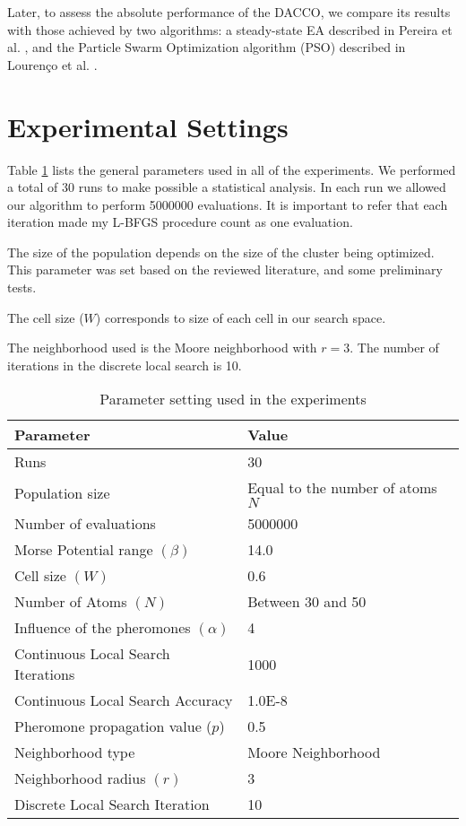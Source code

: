 	Later, to assess the absolute performance of the DACCO, we compare its results with those achieved by two algorithms: a steady-state EA described in Pereira et al. \cite{xico09}, and the Particle Swarm Optimization algorithm (PSO) described in Lourenço et al. \cite{lourenco11}.
	
\section{Experimental Settings}
\label{sec:experimental_setting}

Table \ref{tab:general_settings} lists the general parameters used in all of the experiments. We performed a total of 30 runs to make possible a statistical analysis. In each run we allowed our algorithm to perform 5000000 evaluations. It is important to refer that each iteration made my L-BFGS procedure count as one evaluation. 

The size of the population depends on the size of the cluster being optimized. This parameter was set based on the reviewed literature, and some preliminary tests. 

The cell size ($W$) corresponds to size of each cell in our search space. 

The neighborhood used is the Moore neighborhood with $r = 3$. The number of iterations in the discrete local search is 10.

\begin{table}[!htbp]
	\begin{center}
		\begin{tabular}{| l | p{8cm} |}
			\hline
			\textbf{Parameter} & \textbf{Value} \\ \hline
			Runs & 30 \\
			Population size & Equal to the number of atoms $N$\\
			Number of evaluations & 5000000 \\
			Morse Potential range $(\beta)$ & 14.0 \\ 
			Cell size $(W)$ & 0.6 \\
			Number of Atoms $(N)$ & Between 30 and 50 \\
			Influence of the pheromones $(\alpha)$ & 4 \\
			Continuous Local Search Iterations & 1000\\
			Continuous Local Search Accuracy & 1.0E-8\\
			Pheromone propagation value ($p$) & 0.5 \\
			Neighborhood type & Moore Neighborhood \\
			Neighborhood radius $(r)$ & 3 \\
			Discrete Local Search Iteration & 10 \\
			\hline
		\end{tabular}
	\caption{Parameter setting used in the experiments}
	\label{tab:general_settings}
	\end{center}
\end{table}
\pagebreak

